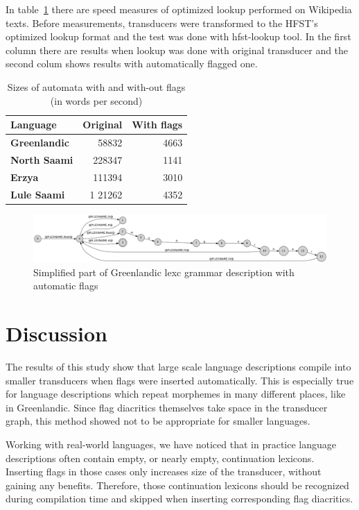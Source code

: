 \documentclass[11pt]{article}
\begin{document}
In table~\ref{table:speed} there are speed measures of optimized lookup performed on Wikipedia texts. Before measurements, transducers were transformed to the HFST's optimized lookup format and the test was done with hfst-lookup tool. In the first column there are results when lookup was done with original transducer and the second colum shows results with automatically flagged one. 

\begin{table}
    \centering
    \begin{tabular}{|l|r|r|}
        \hline
        \bf Language & \bf Original & \bf With flags \\
        \hline
        \bf Greenlandic & 58832 & 4663\\
        \bf North Saami & 228347  & 1141 \\
        \bf Erzya & 111394  & 3010\\
        \bf Lule Saami & 1 21262 & 4352 \\
        \hline
    \end{tabular}
    \caption{Sizes of automata with and with-out flags (in words per second)
    \label{table:speed}}
\end{table}


\begin{figure}
    \includegraphics[width=\textwidth]{gr.png}
     \caption{Simplified part of Greenlandic lexc grammar description with automatic flags
     \label{fig:lexc-gr-flag}}
\end{figure}

\section{Discussion}
\label{sec:discussion}

The results of this study show that large scale language descriptions compile into smaller transducers when flags were inserted automatically. This is especially true for language descriptions which repeat morphemes in many different places, like in Greenlandic. Since flag diacritics themselves take space in the transducer graph, this method showed not to be appropriate for smaller languages.

Working with real-world languages, we have noticed that in practice language descriptions often contain empty, or nearly empty, continuation lexicons. Inserting flags in those cases only increases size of the transducer, without gaining any benefits. Therefore, those continuation lexicons should be recognized during compilation time and skipped when inserting corresponding flag diacritics.
\end{document}
